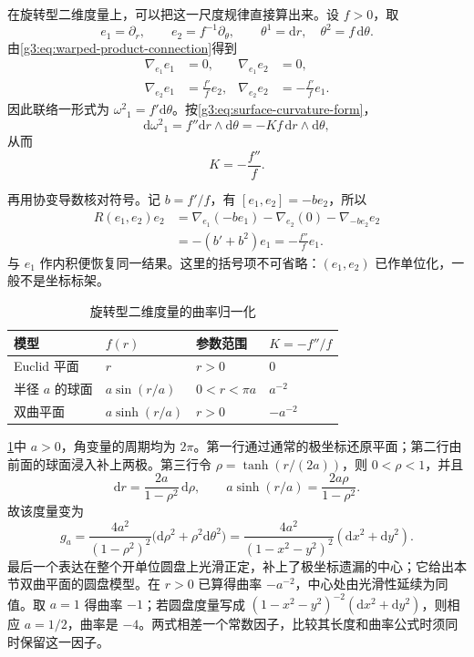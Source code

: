 \ProseParagraphBreak

在旋转型二维度量上，可以把这一尺度规律直接算出来。设 \(f>0\)，取
\[
	e_1=\partial_r,\qquad e_2=f^{-1}\partial_\theta,
	\qquad\theta^1=\mathrm dr,\quad\theta^2=f\,\mathrm d\theta.
\]
由\eqref{g3:eq:warped-product-connection}得到
\begin{equation}\label{g3:eq:warped-surface-frame}
	\begin{aligned}
		\nabla_{e_1}e_1&=0,&\nabla_{e_1}e_2&=0,\\
		\nabla_{e_2}e_1&=\frac{f'}f e_2,&
		\nabla_{e_2}e_2&=-\frac{f'}f e_1.
	\end{aligned}
\end{equation}
因此联络一形式为 \(\omega^2{}_1=f'\mathrm d\theta\)。按\eqref{g3:eq:surface-curvature-form}，
\[
	\mathrm d\omega^2{}_1=f''\mathrm dr\wedge\mathrm d\theta
	=-Kf\,\mathrm dr\wedge\mathrm d\theta,
\]
从而
\begin{equation}\label{g3:eq:warped-surface-curvature}
	K=-\frac{f''}{f}.
\end{equation}

再用协变导数核对符号。记 \(b=f'/f\)，有 \([e_1,e_2]=-be_2\)，所以
\[
	\begin{aligned}
		R(e_1,e_2)e_2
		&=\nabla_{e_1}(-be_1)-\nabla_{e_2}(0)-\nabla_{-be_2}e_2\\
		&=-(b'+b^2)e_1=-\frac{f''}{f}e_1.
	\end{aligned}
\]
与 \(e_1\) 作内积便恢复同一结果。这里的括号项不可省略：\((e_1,e_2)\) 已作单位化，一般不是坐标标架。

\begin{table}[htbp]
	\centering
	\caption{旋转型二维度量的曲率归一化}
	\label{g3:tab:constant-curvature-models}
	\begin{tabular}{llll}
		\toprule
		模型 & \(f(r)\) & 参数范围 & \(K=-f''/f\)\\
		\midrule
		Euclid 平面 & \(r\) & \(r>0\) & \(0\)\\
		半径 \(a\) 的球面 & \(a\sin(r/a)\) & \(0<r<\pi a\) & \(a^{-2}\)\\
		双曲平面 & \(a\sinh(r/a)\) & \(r>0\) & \(-a^{-2}\)\\
		\bottomrule
	\end{tabular}
\end{table}

\cref{g3:tab:constant-curvature-models}中 \(a>0\)，角变量的周期均为 \(2\pi\)。第一行通过通常的极坐标还原平面；第二行由前面的球面浸入补上两极。第三行令 \(\rho=\tanh(r/(2a))\)，则 \(0<\rho<1\)，并且
\[
	\mathrm dr=\frac{2a}{1-\rho^2}\,\mathrm d\rho,\qquad
	a\sinh(r/a)=\frac{2a\rho}{1-\rho^2}.
\]
故该度量变为
\begin{equation}\label{g3:eq:hyperbolic-disk-scale}
	g_a=\frac{4a^2}{(1-\rho^2)^2}
	\bigl(\mathrm d\rho^2+\rho^2\mathrm d\theta^2\bigr)
	=\frac{4a^2}{(1-x^2-y^2)^2}(\mathrm dx^2+\mathrm dy^2).
\end{equation}
最后一个表达在整个开单位圆盘上光滑正定，补上了极坐标遗漏的中心；它给出本节双曲平面的圆盘模型。在 \(r>0\) 已算得曲率 \(-a^{-2}\)，中心处由光滑性延续为同值。取 \(a=1\) 得曲率 \(-1\)；若圆盘度量写成 \((1-x^2-y^2)^{-2}(\mathrm dx^2+\mathrm dy^2)\)，则相应 \(a=1/2\)，曲率是 \(-4\)。两式相差一个常数因子，比较其长度和曲率公式时须同时保留这一因子。

